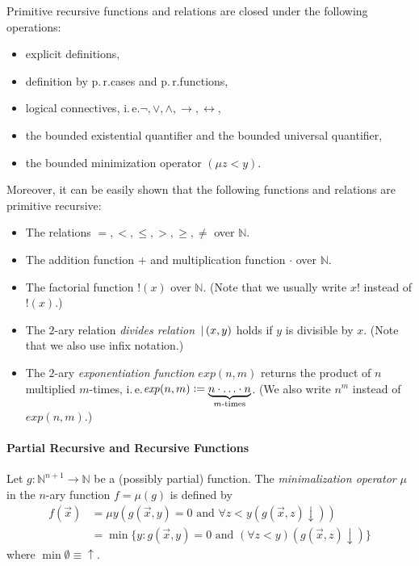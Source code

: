 Primitive recursive functions and relations are closed under the following operations:
\begin{itemize}
\item explicit definitions,
\item definition by p.\,r.\@ cases and p.\,r.\@ functions,
\item logical connectives, i.\,e.\@ $\lnot, \vee, \wedge, \rightarrow, \leftrightarrow$,
\item the bounded existential quantifier and the bounded universal quantifier,
\item the bounded minimization operator $(\mu z < y)$.
\end{itemize}

Moreover, it can be easily shown that the following functions and relations are primitive recursive:
\begin{itemize}
\item The relations $=, <, \le, >, \ge, \neq$ over $\mathbb{N}$.
\item The addition function $+$ and multiplication function $\cdot$ over $\mathbb{N}$.
\item The factorial function $!(x)$ over $\mathbb{N}$. (Note that we usually write $x!$ instead of $!(x)$.)
\item The $2$-ary relation \textit{divides relation} $\,|\,(x,y)$ holds if $y$ is divisible by $x$. (Note that we also use infix notation.)
\item The $2$-ary \textit{exponentiation function} $\mathit{exp}(n,m)$ returns the product of $n$ multiplied $m$-times, i.\,e.\@ $\mathit{exp}(n,m)\vcentcolon= \underbrace{n \cdot \ldots \cdot n}_{m\text{-times}}$. (We also write $n^m$ instead of $\mathit{exp}(n,m)$.)
\end{itemize}

\paragraph{Partial Recursive and Recursive Functions}
Let $g:\mathbb{N}^{n+1} \rightarrow \mathbb{N}$ be a (possibly partial) function. The \textit{minimalization operator} $\mu$ in the $n$-ary function $f = \mu(g)$ is defined by
\begin{align*}
f(\overrightarrow{x}) & = \mu y (g(\overrightarrow{x},y) = 0 \text{ and } \forall z <y (g(\overrightarrow{x},z) \downarrow)) \\
& = \min \lbrace y : g(\overrightarrow{x},y) = 0 \text{ and } (\forall z <y) (g(\overrightarrow{x},z)\downarrow) \rbrace
\end{align*} 
where $\min \emptyset \equiv \uparrow$.

